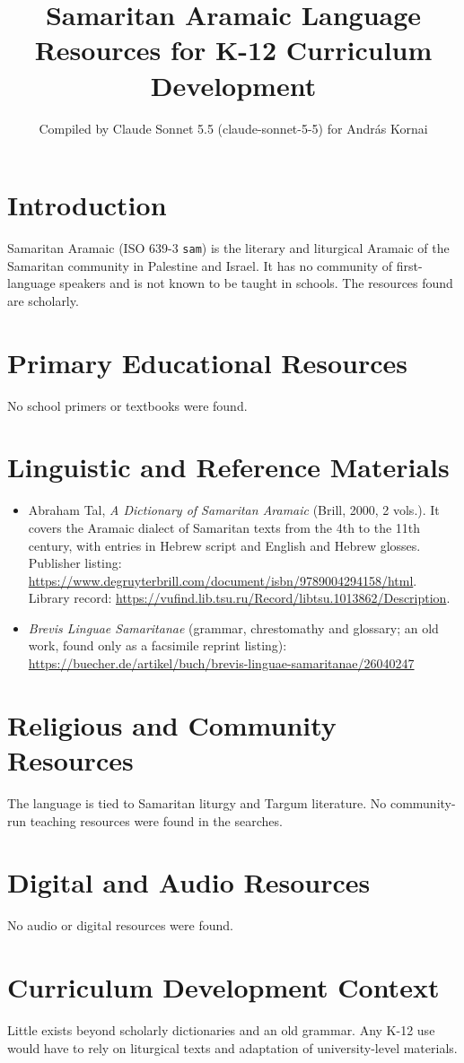 \documentclass[12pt]{article}
\title{Samaritan Aramaic Language Resources for K-12 Curriculum Development}
\author{Compiled by Claude Sonnet 5.5 (claude-sonnet-5-5) for Andr\'as Kornai}
\date{}
\begin{document}
\maketitle

\section{Introduction}
Samaritan Aramaic (ISO 639-3 \texttt{sam}) is the literary and liturgical Aramaic of the Samaritan community in Palestine and Israel. It has no community of first-language speakers and is not known to be taught in schools. The resources found are scholarly.

\section{Primary Educational Resources}
No school primers or textbooks were found.

\section{Linguistic and Reference Materials}
\begin{itemize}
\item Abraham Tal, \emph{A Dictionary of Samaritan Aramaic} (Brill, 2000, 2 vols.). It covers the Aramaic dialect of Samaritan texts from the 4th to the 11th century, with entries in Hebrew script and English and Hebrew glosses. Publisher listing: \url{https://www.degruyterbrill.com/document/isbn/9789004294158/html}. Library record: \url{https://vufind.lib.tsu.ru/Record/libtsu.1013862/Description}.
\item \emph{Brevis Linguae Samaritanae} (grammar, chrestomathy and glossary; an old work, found only as a facsimile reprint listing): \url{https://buecher.de/artikel/buch/brevis-linguae-samaritanae/26040247}
\end{itemize}

\section{Religious and Community Resources}
The language is tied to Samaritan liturgy and Targum literature. No community-run teaching resources were found in the searches.

\section{Digital and Audio Resources}
No audio or digital resources were found.

\section{Curriculum Development Context}
Little exists beyond scholarly dictionaries and an old grammar. Any K-12 use would have to rely on liturgical texts and adaptation of university-level materials.
\end{document}
